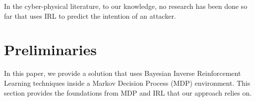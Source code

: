 \documentclass[conference]{IEEEtran}
\begin{document}
In the cyber-physical literature, to our knowledge, no research has been done so far that uses IRL to predict the intention of an attacker.


\section{Preliminaries}\label{sec:Preliminaries}
In this paper, we provide a solution that uses Bayesian Inverse Reinforcement Learning techniques inside a Markov Decision Process (MDP) environment. This section provides the foundations from MDP and IRL that our approach relies on.
\end{document}

